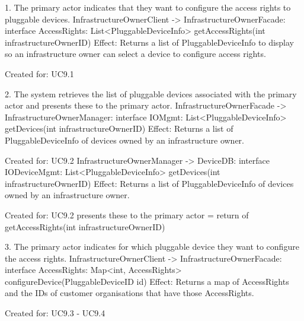             1. The primary actor indicates that they want to configure the access rights to pluggable devices.
                InfrastructureOwnerClient -> InfrastructureOwnerFacade: interface AccessRights: List<PluggableDeviceInfo> getAccessRights(int infrastructureOwnerID)
                    Effect: Returns a list of PluggableDeviceInfo to display so an infrastructure owner can select a device to configure access rights.
                    \item Created for: UC9.1

            2. The system retrieves the list of pluggable devices associated with the primary actor and presents these to the primary actor.
                InfrastructureOwnerFacade -> InfrastructureOwnerManager: interface IOMgmt:     List<PluggableDeviceInfo>  getDevices(int infrastructureOwnerID)
                    Effect: Returns a list of PluggableDeviceInfo of devices owned by an infrastructure owner.
                    \item Created for: UC9.2
                InfrastructureOwnerManager -> DeviceDB:                  interface IODeviceMgmt: List<PluggableDeviceInfo>  getDevices(int infrastructureOwnerID)
                    Effect: Returns a list of PluggableDeviceInfo of devices owned by an infrastructure owner.
                    \item Created for: UC9.2
                presents these to the primary actor = return of getAccessRights(int infrastructureOwnerID)

            3. The primary actor indicates for which pluggable device they want to configure the access rights.
                InfrastructureOwnerClient -> InfrastructureOwnerFacade: interface AccessRights: Map<int, AccessRights> configureDevice(PluggableDeviceID id)
                    Effect: Returns a map of AccessRights and the IDs of customer organisations that have those AccessRights.
                    \item Created for: UC9.3 - UC9.4

